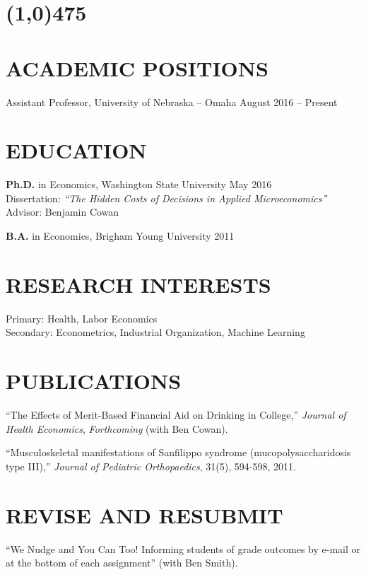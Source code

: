 \documentclass[margin]{res}  %
\begin{document}
\begin{resume} 
\section{\line(1,0){475}} %

\section{\textnormal{ACADEMIC POSITIONS}} 
Assistant Professor, University of Nebraska -- Omaha \hfill August 2016  -- Present\\

\section{\textnormal{EDUCATION}} 
\textbf{Ph.D.} in Economics, Washington State University \hfill May 2016 \\
Dissertation: \emph{``The Hidden Costs of Decisions in Applied Microeconomics''}\\
Advisor: Benjamin Cowan

\textbf{B.A.} in Economics, Brigham Young University \hfill 2011

\section{\textnormal{RESEARCH INTERESTS}}
Primary: Health, Labor Economics \\
Secondary: Econometrics, Industrial Organization, Machine Learning

\section{\textnormal{PUBLICATIONS}}

``The Effects of Merit-Based Financial Aid on Drinking in College,'' {\it Journal of Health Economics}, \emph{Forthcoming} (with Ben Cowan).

``Musculoskeletal manifestations of Sanfilippo syndrome (mucopolysaccharidosis type III),'' {\it Journal of Pediatric Orthopaedics}, 31(5), 594-598, 2011.
 
 \section{\textnormal{REVISE AND RESUBMIT}}
``We Nudge and You Can Too! Informing students of grade outcomes by e-mail or at the bottom of each assignment'' (with Ben Smith).
 

\end{resume}
\end{document}
